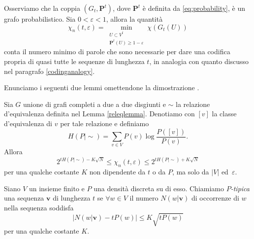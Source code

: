Osserviamo che la coppia \((G_t, \mathbf{P}^t)\), dove \(\mathbf{P}^t\) è definita da \eqref{eq:probability}, è un grafo probabilistico. Sia \(0<\varepsilon <1\), allora la quantità
\[\chi_{n}(t,\varepsilon) = \min_{\substack{U\subset V^{t}\\\mathbf{P}^t(U)\ge 1-\varepsilon}} \chi(G_{t}(U))\]
conta il numero minimo di parole che sono necessarie per dare una codifica propria di quasi tutte le sequenze di lunghezza \(t\), in analogia con quanto discusso nel paragrafo \ref{codinganalogy}.

Enunciamo i seguenti due lemmi omettendone la dimostrazione \cite{Korner1971}. 
\begin{lemma}
  \label{boundslemma} Sia \(G\) unione di grafi completi a due a due disgiunti e \(\sim\) la relazione d'equivalenza definita nel Lemma \ref{releqlemma}. Denotiamo con \([v]\) la classe d'equivalenza di \(v\) per tale relazione e definiamo
  \[H(P\mid \sim)=\sum_{v\in V} P(v)\log{\frac{P([v])}{P(v)}}.\]
  Allora
  \[2^{tH(P\mid \sim)-K\sqrt{N}}\le \chi_{n}(t,\varepsilon)\le 2^{tH(P\mid \sim)+K\sqrt{N}}\]
  per una qualche costante \(K\) non dipendente da \(t\) o da \(P\), ma solo da \(|V|\) ed\ \(\varepsilon\). 
\end{lemma}
\begin{definition}
  Siano \(V\) un insieme finito e \(P\) una densità discreta su di esso. Chiamiamo \emph{\(P\)-tipica} una sequenza \(\mathbf{v}\) di lunghezza \(t\) se \(\forall w\in V\) il numero \(N(w\vert \mathbf{v})\) di occorrenze di \(w\) nella sequenza soddisfa
  \[\Big| N(w\vert\mathbf{v}) - tP(w)\Big|\le K\sqrt{tP(w)}\]
  per una qualche costante \(K\). 
\end{definition}

